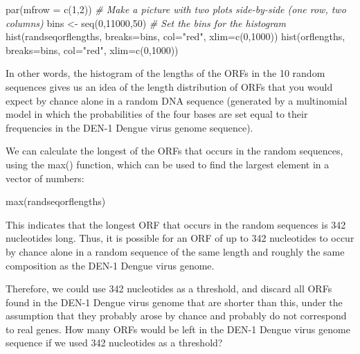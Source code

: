 \documentclass[
]{book}
\newenvironment{Shaded}{\begin{snugshade}}{\end{snugshade}}
\newcommand{\AttributeTok}[1]{\textcolor[rgb]{0.77,0.63,0.00}{#1}}
\newcommand{\CommentTok}[1]{\textcolor[rgb]{0.56,0.35,0.01}{\textit{#1}}}
\newcommand{\DecValTok}[1]{\textcolor[rgb]{0.00,0.00,0.81}{#1}}
\newcommand{\FunctionTok}[1]{\textcolor[rgb]{0.00,0.00,0.00}{#1}}
\newcommand{\NormalTok}[1]{#1}
\newcommand{\OtherTok}[1]{\textcolor[rgb]{0.56,0.35,0.01}{#1}}
\newcommand{\StringTok}[1]{\textcolor[rgb]{0.31,0.60,0.02}{#1}}
\begin{document}
\begin{Shaded}
\begin{Highlighting}[]
\FunctionTok{par}\NormalTok{(}\AttributeTok{mfrow =} \FunctionTok{c}\NormalTok{(}\DecValTok{1}\NormalTok{,}\DecValTok{2}\NormalTok{))                      }\CommentTok{\# Make a picture with two plots side{-}by{-}side (one row, two columns)}
\NormalTok{bins }\OtherTok{\textless{}{-}} \FunctionTok{seq}\NormalTok{(}\DecValTok{0}\NormalTok{,}\DecValTok{11000}\NormalTok{,}\DecValTok{50}\NormalTok{)                  }\CommentTok{\# Set the bins for the histogram}
\FunctionTok{hist}\NormalTok{(randseqorflengths, }\AttributeTok{breaks=}\NormalTok{bins, }\AttributeTok{col=}\StringTok{"red"}\NormalTok{, }\AttributeTok{xlim=}\FunctionTok{c}\NormalTok{(}\DecValTok{0}\NormalTok{,}\DecValTok{1000}\NormalTok{))}
\FunctionTok{hist}\NormalTok{(orflengths, }\AttributeTok{breaks=}\NormalTok{bins, }\AttributeTok{col=}\StringTok{"red"}\NormalTok{, }\AttributeTok{xlim=}\FunctionTok{c}\NormalTok{(}\DecValTok{0}\NormalTok{,}\DecValTok{1000}\NormalTok{))}
\end{Highlighting}
\end{Shaded}

In other words, the histogram of the lengths of the ORFs in the 10 random sequences gives us an idea of the length distribution of ORFs that you would expect by chance alone in a random DNA sequence (generated by a multinomial model in which the probabilities of the four bases are set equal to their frequencies in the DEN-1 Dengue virus genome sequence).

We can calculate the longest of the ORFs that occurs in the random sequences, using the max() function, which can be used to find the largest element in a vector of numbers:

\begin{Shaded}
\begin{Highlighting}[]
\FunctionTok{max}\NormalTok{(randseqorflengths)}
\end{Highlighting}
\end{Shaded}

This indicates that the longest ORF that occurs in the random sequences is 342 nucleotides long. Thus, it is possible for an ORF of up to 342 nucleotides to occur by chance alone in a random sequence of the same length and roughly the same composition as the DEN-1 Dengue virus genome.

Therefore, we could use 342 nucleotides as a threshold, and discard all ORFs found in the DEN-1 Dengue virus genome that are shorter than this, under the assumption that they probably arose by chance and probably do not correspond to real genes. How many ORFs would be left in the DEN-1 Dengue virus genome sequence if we used 342 nucleotides as a threshold?
\end{document}
